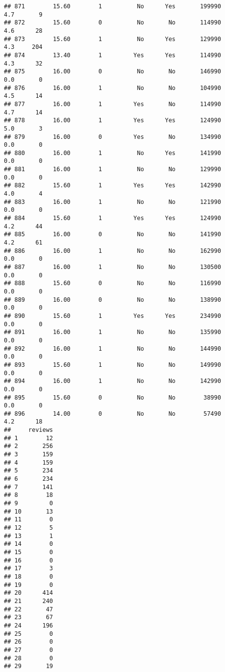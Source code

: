 \documentclass[
]{article}
\begin{document}
\begin{verbatim}
## 871        15.60        1          No      Yes       199990         4.7       9
## 872        15.60        0          No       No       114990         4.6      28
## 873        15.60        1          No      Yes       129990         4.3     204
## 874        13.40        1         Yes      Yes       114990         4.3      32
## 875        16.00        0          No       No       146990         0.0       0
## 876        16.00        1          No       No       104990         4.5      14
## 877        16.00        1         Yes       No       114990         4.7      14
## 878        16.00        1         Yes      Yes       124990         5.0       3
## 879        16.00        0         Yes       No       134990         0.0       0
## 880        16.00        1          No      Yes       141990         0.0       0
## 881        16.00        1          No       No       129990         0.0       0
## 882        15.60        1         Yes      Yes       142990         4.0       4
## 883        16.00        1          No       No       121990         0.0       0
## 884        15.60        1         Yes      Yes       124990         4.2      44
## 885        16.00        0          No       No       141990         4.2      61
## 886        16.00        1          No       No       162990         0.0       0
## 887        16.00        1          No       No       130500         0.0       0
## 888        15.60        0          No       No       116990         0.0       0
## 889        16.00        0          No       No       138990         0.0       0
## 890        15.60        1         Yes      Yes       234990         0.0       0
## 891        16.00        1          No       No       135990         0.0       0
## 892        16.00        1          No       No       144990         0.0       0
## 893        15.60        1          No       No       149990         0.0       0
## 894        16.00        1          No       No       142990         0.0       0
## 895        15.60        0          No       No        38990         0.0       0
## 896        14.00        0          No       No        57490         4.2      18
##     reviews
## 1        12
## 2       256
## 3       159
## 4       159
## 5       234
## 6       234
## 7       141
## 8        18
## 9         0
## 10       13
## 11        0
## 12        5
## 13        1
## 14        0
## 15        0
## 16        0
## 17        3
## 18        0
## 19        0
## 20      414
## 21      240
## 22       47
## 23       67
## 24      196
## 25        0
## 26        0
## 27        0
## 28        0
## 29       19

\end{verbatim}
\end{document}
